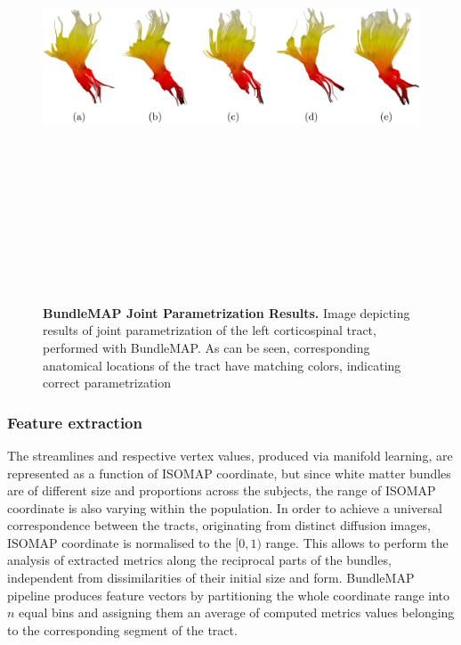 \documentclass[thesis.tex]{subfiles}
\begin{document}
\begin{figure}
\centering
\includegraphics[width=14cm,height=14cm,keepaspectratio]{thesis_radomskyi/images/bundlemap-parametrisation-results.jpg}
\caption{\textbf{BundleMAP Joint Parametrization Results.} Image depicting results of joint parametrization of the left corticospinal tract, performed with BundleMAP. As can be seen, corresponding anatomical locations of the tract have matching colors, indicating correct parametrization \cite{Khatami2017BundleMap}}
\label{fig:bundlemap-parametrisation-results}
\end{figure}

\subsubsection{Feature extraction}
The streamlines and respective vertex values, produced via manifold learning, are represented as a function of ISOMAP coordinate, but since white matter bundles are of different size and proportions across the subjects, the range of ISOMAP coordinate is also varying within the population. In order to achieve a universal correspondence between the tracts, originating from distinct diffusion images, ISOMAP coordinate is normalised to the $[0,1)$ range. This allows to perform the analysis of extracted metrics along the reciprocal parts of the bundles, independent from dissimilarities of their initial size and form. BundleMAP pipeline produces feature vectors by partitioning the whole coordinate range into $n$ equal bins and assigning them an average of computed metrics values belonging to the corresponding segment of the tract.
\end{document}
